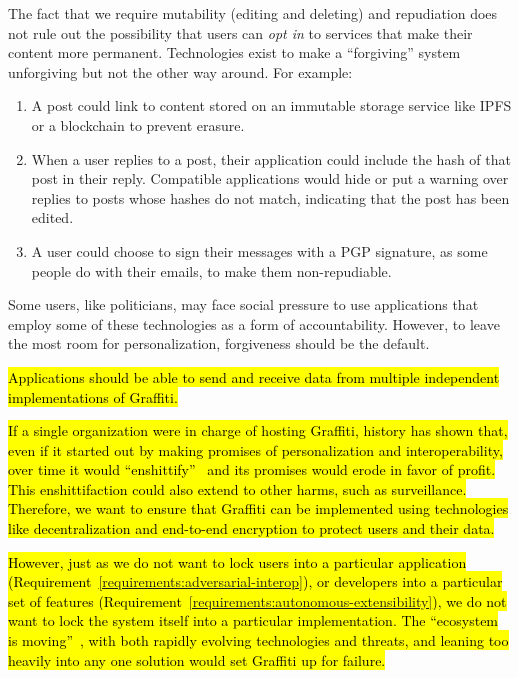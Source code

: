 The fact that we require mutability (editing and deleting) and repudiation does not rule
out the possibility that users can \emph{opt in} to services that make their content more permanent.
Technologies exist to make a ``forgiving'' system unforgiving but not the other way around.
For example:
\begin{enumerate}
\item
A post could link to content stored on an immutable storage service like IPFS
or a blockchain to prevent erasure.
\item
When a user replies to a post, their application could include the hash
of that post in their reply. Compatible applications would
hide or put a warning over replies to posts whose hashes do not match,
indicating that the post has been edited.
\item
A user could choose to sign their messages with a PGP signature,
as some people do with their emails, to make them non-repudiable.
\end{enumerate}
Some users, like politicians, may face social pressure to use applications
that employ some of these technologies as a form of accountability.
However, to leave the most room for personalization, forgiveness should be the default.

\begin{requirement}
\label{requirements:parallel-implementations}
\hl{%
    Applications should be able to send and receive data
    from multiple independent implementations of Graffiti.
}%
\end{requirement}

\hl{%
If a single organization were in charge of hosting Graffiti,
history has shown that, even if it started out by making promises of
personalization and interoperability,
over time it would ``enshittify''~{\cite{enshittification}}
and its promises would erode in favor of profit.
This enshittifaction could also extend to other harms,
such as surveillance.
Therefore, we want to ensure that Graffiti can be implemented using
technologies like decentralization and end-to-end encryption
to protect users and their data.
}%

\hl{%
However, just as we do not want to lock users into a particular application (Requirement~{\ref{requirements:adversarial-interop}}),
or developers into a particular set of features (Requirement~{\ref{requirements:autonomous-extensibility}}),
we do not want to lock the system itself into a particular implementation.
The ``ecosystem is moving''~{\cite{ecosystemmoving}}, with both rapidly evolving
technologies and threats, and
leaning too heavily into any one solution would set Graffiti up for failure.
}%

